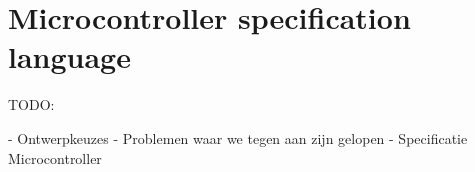 \chapter[Grammar explanation]{Microcontroller specification language}



TODO:

- Ontwerpkeuzes
- Problemen waar we tegen aan zijn gelopen
- Specificatie Microcontroller
